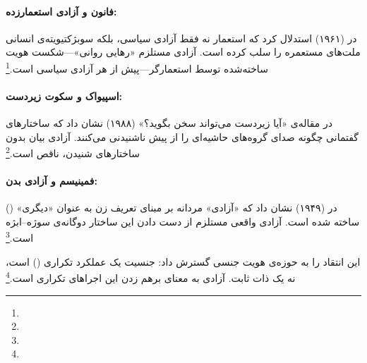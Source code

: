 \paragraph{فانون و آزادی استعمارزده:}
 در  (۱۹۶۱) استدلال کرد که استعمار نه فقط آزادی سیاسی، بلکه سوبژکتیویته‌ی انسانی ملت‌های مستعمره را سلب کرده است. آزادی مستلزم «رهایی روانی»—شکست هویت ساخته‌شده توسط استعمارگر—پیش از هر آزادی سیاسی است.\footnote{} %

\paragraph{اسپیواک و سکوت زیردست:}
 در مقاله‌ی «آیا زیردست می‌تواند سخن بگوید؟» (۱۹۸۸) نشان داد که ساختارهای گفتمانی چگونه صدای گروه‌های حاشیه‌ای را از پیش ناشنیدنی می‌کنند. آزادی بیان بدون ساختارهای شنیدن، ناقص است.\footnote{} %

\paragraph{فمینیسم و آزادی بدن:}
 در  (۱۹۴۹) نشان داد که «آزادی» مردانه بر مبنای تعریف زن به عنوان «دیگری» () ساخته شده است. آزادی واقعی مستلزم از دست دادن این ساختار دوگانه‌ی سوژه–ابژه است.\footnote{} %

 این انتقاد را به حوزه‌ی هویت جنسی گسترش داد: جنسیت یک عملکرد تکراری () است، نه یک ذات ثابت. آزادی به معنای برهم زدن این اجرا‌های تکراری است.\footnote{} %

\vspace{0.4cm}

